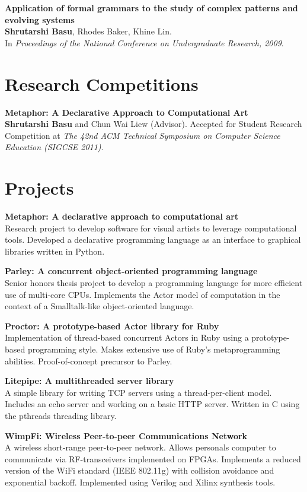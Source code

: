 \documentclass[margin,line]{resume}
\begin{document}
\begin{resume}
    {\bf Application of formal grammars to the study of complex patterns and evolving
      systems}\\
    {\bf Shrutarshi Basu}, Rhodes Baker, Khine Lin. \\
    In \emph{Proceedings of the National Conference on Undergraduate Research, 2009}.

    \section{Research Competitions}
    {\bf Metaphor: A Declarative Approach to Computational Art} \\
    {\bf Shrutarshi Basu} and Chun Wai Liew (Advisor). 
    Accepted for Student Research Competition at \emph{The 42nd ACM Technical
      Symposium on Computer Science Education (SIGCSE 2011)}.

    \section{Projects}
    {\bf Metaphor: A declarative approach to computational art}\\
    Research project to develop software for visual artists to leverage
    computational tools. Developed a declarative programming language as an
    interface to graphical libraries written in Python.

    {\bf Parley: A concurrent object-oriented programming language}\\
    Senior honors thesis project to develop a programming language for more
    efficient use of multi-core CPUs. Implements the Actor model of computation
    in the context of a Smalltalk-like object-oriented language.

    {\bf Proctor: A prototype-based Actor library for Ruby} \\
    Implementation of thread-based concurrent Actors in Ruby using a
    prototype-based programming style. Makes extensive use of Ruby's
    metaprogramming abilities. Proof-of-concept precursor to Parley.

    {\bf Litepipe: A multithreaded server library} \\
    A simple library for writing TCP servers using a thread-per-client
    model. Includes an echo server and working on a basic HTTP server. Written
    in C using the pthreads threading library.

    {\bf WimpFi: Wireless Peer-to-peer Communications Network}\\
    A wireless short-range peer-to-peer network. Allows personals computer to
    communicate via RF-transceivers implemented on FPGAs. Implements a reduced
    version of the WiFi standard (IEEE 802.11g) with collision avoidance and
    exponential backoff. Implemented using Verilog and Xilinx synthesis tools.
    

\end{resume}
\end{document}
